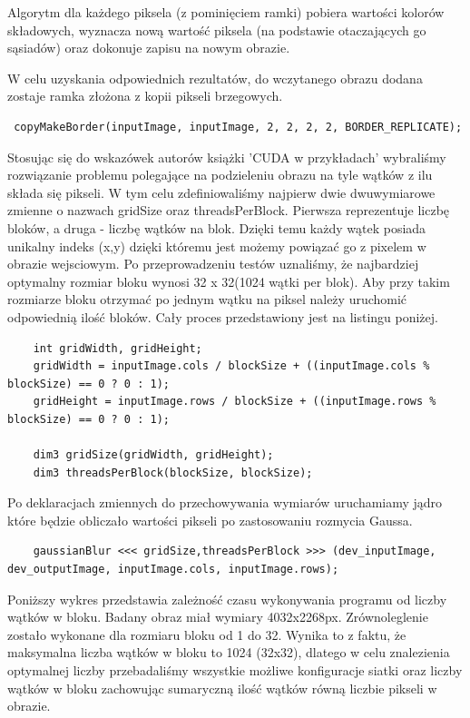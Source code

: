 \documentclass[a4paper,12pt]{article}
\begin{document}
Algorytm dla każdego piksela (z pominięciem ramki) pobiera wartości kolorów składowych, wyznacza nową wartość piksela (na podstawie otaczających go sąsiadów) oraz dokonuje zapisu na nowym obrazie. \newline

\noindent W celu uzyskania odpowiednich rezultatów, do wczytanego obrazu dodana zostaje ramka złożona z kopii pikseli brzegowych. 

\begin{lstlisting}
 copyMakeBorder(inputImage, inputImage, 2, 2, 2, 2, BORDER_REPLICATE);
\end{lstlisting}

Stosując się do wskazówek autorów książki 'CUDA w przykładach' wybraliśmy rozwiązanie problemu polegające na podzieleniu obrazu na tyle wątków z ilu składa się pikseli. W tym celu zdefiniowaliśmy najpierw dwie dwuwymiarowe zmienne o nazwach gridSize oraz threadsPerBlock. Pierwsza reprezentuje liczbę bloków, a druga - liczbę wątków na blok. Dzięki temu każdy wątek posiada unikalny indeks (x,y) dzięki któremu jest możemy powiązać go z pixelem w obrazie wejsciowym. Po przeprowadzeniu testów uznaliśmy, że najbardziej optymalny rozmiar bloku wynosi 32 x 32(1024 wątki per blok). Aby przy takim rozmiarze bloku otrzymać po jednym wątku na piksel należy uruchomić odpowiednią ilość bloków. Cały proces przedstawiony jest na listingu poniżej.

\begin{lstlisting}
	int gridWidth, gridHeight;
    gridWidth = inputImage.cols / blockSize + ((inputImage.cols % blockSize) == 0 ? 0 : 1);
    gridHeight = inputImage.rows / blockSize + ((inputImage.rows % blockSize) == 0 ? 0 : 1);

    dim3 gridSize(gridWidth, gridHeight);
    dim3 threadsPerBlock(blockSize, blockSize);
\end{lstlisting}

Po deklaracjach zmiennych do przechowywania wymiarów uruchamiamy jądro które będzie obliczało wartości pikseli po zastosowaniu rozmycia Gaussa.

\begin{lstlisting}
    gaussianBlur <<< gridSize,threadsPerBlock >>> (dev_inputImage, dev_outputImage, inputImage.cols, inputImage.rows);
\end{lstlisting}

Poniższy wykres przedstawia zależność czasu wykonywania programu od liczby wątków w bloku. Badany obraz miał wymiary 4032x2268px. Zrównoleglenie zostało wykonane dla rozmiaru bloku od 1 do 32. Wynika to z faktu, że maksymalna liczba wątków w bloku to 1024 (32x32), dlatego w celu znalezienia optymalnej liczby przebadaliśmy wszystkie możliwe konfiguracje siatki oraz liczby wątków w bloku zachowując sumaryczną ilość wątków równą liczbie pikseli w obrazie.
\end{document}
